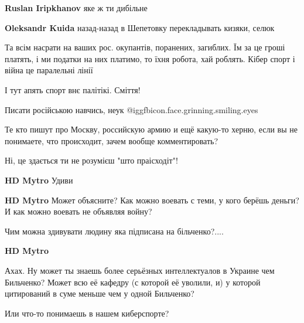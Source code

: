 \begin{itemize}
\begin{itemize}
\begin{itemize}
\begin{itemize} %
\textbf{Ruslan Iripkhanov} яке ж ти дибільне

\textbf{Oleksandr Kuida} назад-назад в Шепетовку перекладывать кизяки, селюк
\end{itemize} %

\end{itemize} %


Та всім насрати на ваших рос. окупантів, поранених, загиблих. Їм за це гроші
платять, і ми податки на них платимо, то їхня робота, хай роблять. Кібер спорт
і війна це паралельні лінії

\end{itemize} %

І тут апять спорт внє палітікі. Сміття!

\begin{itemize} %
Писати російською навчись, неук @igg{fbicon.face.grinning.smiling.eyes} 
\end{itemize} %


Те кто пишут про Москву, российскую армию и ещё какую-то херню, если вы не
понимаете, что происходит, зачем вообще комментировать?

\begin{itemize} %
Ні, це здається ти не розумієш "што праісходіт"!

\begin{itemize} %
\textbf{HD Mytro} Удиви

\textbf{HD Mytro} Может объясните? Как можно воевать с теми, у кого берёшь деньги? И как можно воевать не объявляя войну?
\end{itemize} %

Чим можна здивувати людину яка підписана на більченко?....

\begin{itemize} %
\textbf{HD Mytro} 

Ахах. Ну может ты знаешь более серьёзных интеллектуалов в Украине чем
Бильченко? Может всю её кафедру (с которой её уволили, и) у которой цитирований
в суме меньше чем у одной Бильченко?

Или что-то понимаешь в нашем киберспорте?


\end{itemize}
\end{itemize}
\end{itemize}
